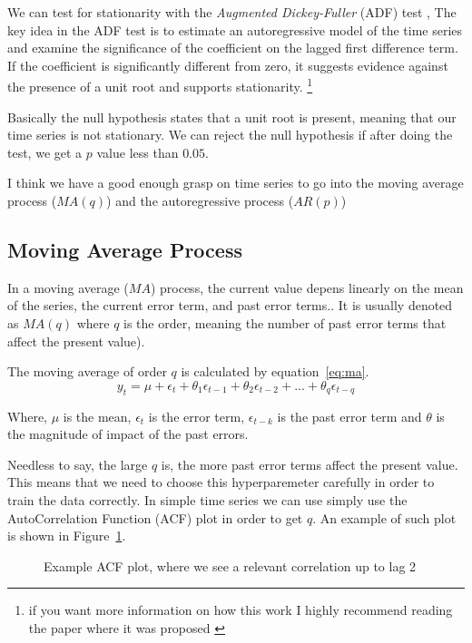 \documentclass[journal]{IEEEtran}
\begin{document}
We can test for stationarity with the \emph{Augmented Dickey-Fuller} (ADF) test
\cite{adf}, The key idea in the ADF test is to estimate an autoregressive model
of the time series and examine the significance of the coefficient on the
lagged first difference term. If the coefficient is significantly different
from zero, it suggests evidence against the presence of a unit root and
supports stationarity. \footnote{if you want more information on how this work
I highly recommend reading the paper where it was proposed \cite{adf}}

Basically the null hypothesis states that a unit root is present, meaning that
our time series is not stationary. We can reject the null hypothesis if after
doing the test, we get a $p$ value less than $0.05$.

I think we have a good enough grasp on time series to go into the moving
average process ($MA(q)$) and the autoregressive process ($AR(p)$)

\subsection{Moving Average Process}\label{sub:ma}

In a moving average ($MA$) process, the current value depens linearly on the
mean of the series, the current error term, and past error
terms.\cite{timeseries}. It is usually denoted as $MA(q)$ where $q$ is the
order, meaning the number of past error terms that affect the present value).

The moving average of order $q$ is calculated by equation~\ref{eq:ma}.
\begin{equation}
    y_t = \mu + \epsilon_t + \theta_1\epsilon_{t-1} + \theta_2\epsilon_{t-2} +
            ... +  \theta_q\epsilon_{t-q}
    \label{eq:ma}
\end{equation}

Where, $\mu$ is the mean, $\epsilon_t$ is the error term, $\epsilon_{t-k}$ is
the past error term and $\theta$ is the magnitude of impact of the past errors.

Needless to say, the large $q$ is, the more past error terms affect the
present value. This means that we need to choose this hyperparemeter carefully
in order to train the data correctly. In simple time series we can use simply
use the AutoCorrelation Function (ACF) plot in  order to get $q$. An example
of such plot is shown in Figure~\ref{fig:acf}.

\begin{figure}[htbp]
  \centering
  
    \caption{Example ACF plot, where we see a relevant correlation up to lag 2}
  \label{fig:acf}
\end{figure}
\end{document}
